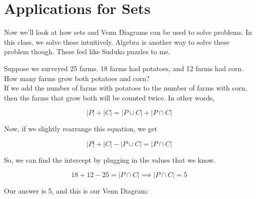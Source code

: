 \section{Applications for Sets}

Now we'll look at how sets and Venn Diagrams can be used to solve problems. In this class, we solve these intuitively. Algebra is another way to solve these problem though. These feel like Suduko puzzles to me.

\begin{boxexample}{}{}
	Suppose we surveyed 25 farms. 18 farms had potatoes, and 12 farms had corn. How many farms grow both potatoes and corn?\\

	If we add the number of farms with potatoes to the number of farms with corn, then the farms that grow both will be counted twice. In other words,

	\[
		|P|+|C|=|P \cup C| + |P \cap C|
	\]

	Now, if we slightly rearrange this equation, we get

	\[
		|P|+|C| - |P \cup C|=|P \cap C|
	\]

	So, we can find the intercept by plugging in the values that we know.

	\[
		18+12-25=|P \cap C| \implies |P \cap C|=5
	\]

	Our answer is 5, and this is our Venn Diagram:

	\begin{venndiagram2sets}[shade=skyblue,showframe=false,labelA={P},labelB={C},labelOnlyA={13},labelOnlyB={7},labelAB={5}]
		\fillACapB
	\end{venndiagram2sets}

\end{boxexample}

